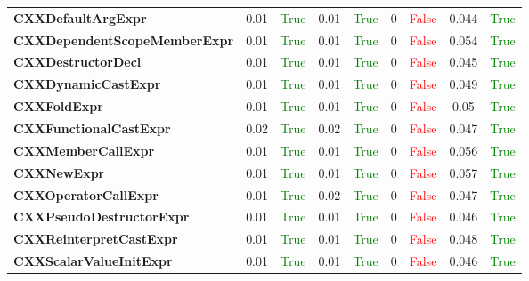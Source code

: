 \documentclass{article}
\begin{document}
\begin{xltabular}{\textwidth}{lcccccccc}
\textbf{{\fontsize{10}{12}\selectfont CXXDefaultArgExpr}}& 0.01&\textcolor{green}{True}& 0.01&\textcolor{green}{True}& 0&\textcolor{red}{False}& 0.044&\textcolor{green}{True} \\[0.5ex]
\textbf{{\fontsize{10}{12}\selectfont CXXDependentScopeMemberExpr}}& 0.01&\textcolor{green}{True}& 0.01&\textcolor{green}{True}& 0&\textcolor{red}{False}& 0.054&\textcolor{green}{True} \\[0.5ex]
\textbf{{\fontsize{10}{12}\selectfont CXXDestructorDecl}}& 0.01&\textcolor{green}{True}& 0.01&\textcolor{green}{True}& 0&\textcolor{red}{False}& 0.045&\textcolor{green}{True} \\[0.5ex]
\textbf{{\fontsize{10}{12}\selectfont CXXDynamicCastExpr}}& 0.01&\textcolor{green}{True}& 0.01&\textcolor{green}{True}& 0&\textcolor{red}{False}& 0.049&\textcolor{green}{True} \\[0.5ex]
\textbf{{\fontsize{10}{12}\selectfont CXXFoldExpr}}& 0.01&\textcolor{green}{True}& 0.01&\textcolor{green}{True}& 0&\textcolor{red}{False}& 0.05&\textcolor{green}{True} \\[0.5ex]
\textbf{{\fontsize{10}{12}\selectfont CXXFunctionalCastExpr}}& 0.02&\textcolor{green}{True}& 0.02&\textcolor{green}{True}& 0&\textcolor{red}{False}& 0.047&\textcolor{green}{True} \\[0.5ex]
\textbf{{\fontsize{10}{12}\selectfont CXXMemberCallExpr}}& 0.01&\textcolor{green}{True}& 0.01&\textcolor{green}{True}& 0&\textcolor{red}{False}& 0.056&\textcolor{green}{True} \\[0.5ex]
\textbf{{\fontsize{10}{12}\selectfont CXXNewExpr}}& 0.01&\textcolor{green}{True}& 0.01&\textcolor{green}{True}& 0&\textcolor{red}{False}& 0.057&\textcolor{green}{True} \\[0.5ex]
\textbf{{\fontsize{10}{12}\selectfont CXXOperatorCallExpr}}& 0.01&\textcolor{green}{True}& 0.02&\textcolor{green}{True}& 0&\textcolor{red}{False}& 0.047&\textcolor{green}{True} \\[0.5ex]
\textbf{{\fontsize{10}{12}\selectfont CXXPseudoDestructorExpr}}& 0.01&\textcolor{green}{True}& 0.01&\textcolor{green}{True}& 0&\textcolor{red}{False}& 0.046&\textcolor{green}{True} \\[0.5ex]
\textbf{{\fontsize{10}{12}\selectfont CXXReinterpretCastExpr}}& 0.01&\textcolor{green}{True}& 0.01&\textcolor{green}{True}& 0&\textcolor{red}{False}& 0.048&\textcolor{green}{True} \\[0.5ex]
\textbf{{\fontsize{10}{12}\selectfont CXXScalarValueInitExpr}}& 0.01&\textcolor{green}{True}& 0.01&\textcolor{green}{True}& 0&\textcolor{red}{False}& 0.046&\textcolor{green}{True} \\[0.5ex]

\end{xltabular}
\end{document}
